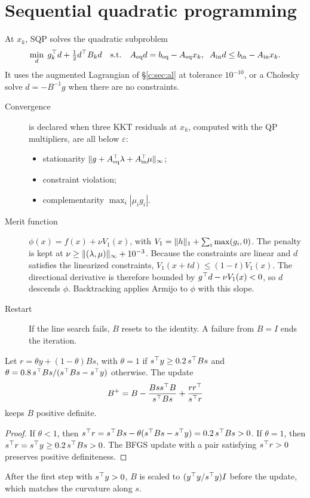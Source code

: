 \section{Sequential quadratic programming}
At $x_k$, SQP solves the quadratic subproblem
\[
  \min_d\;g_k^\top d+\tfrac12d^\top B_kd\quad\text{s.t.}\quad
  A_{\text{eq}}d=b_{\text{eq}}-A_{\text{eq}}x_k,\;\;A_{\text{in}}d\le b_{\text{in}}-A_{\text{in}}x_k .
\]
It uses the augmented Lagrangian of \S\ref{c:sec:al} at tolerance $10^{-10}$, or a Cholesky
solve $d=-B^{-1}g$ when there are no constraints.
\begin{description}
  \item[Convergence] is declared when three KKT residuals at $x_k$, computed with the QP
        multipliers, are all below $\varepsilon$:
        \begin{itemize}
          \item stationarity
                $\lVert g+A_{\text{eq}}^\top\lambda+A_{\text{in}}^\top\mu\rVert_\infty$;
          \item constraint violation;
          \item complementarity $\max_i|\mu_ig_i|$.
        \end{itemize}
  \item[Merit function] $\phi(x)=f(x)+\nu V_1(x)$, with
        $V_1=\lVert h\rVert_1+\sum_i\max(g_i,0)$. The penalty is kept at
        $\nu\ge\lVert (\lambda,\mu)\rVert_\infty+10^{-3}$. Because the constraints are linear and
        $d$ satisfies the linearized constraints, $V_1(x+td)\le(1-t)V_1(x)$. The
        directional derivative is therefore bounded by $g^\top d-\nu V_1(x)<0$, so $d$
        descends $\phi$. Backtracking applies Armijo to $\phi$ with this slope.
  \item[Restart] If the line search fails, $B$ resets to the identity. A failure from
        $B=I$ ends the iteration.
\end{description}

\begin{proposition}
Let $r=\theta y+(1-\theta)Bs$, with $\theta=1$ if $s^\top y\ge0.2\,s^\top Bs$ and
$\theta=0.8\,s^\top Bs/(s^\top Bs-s^\top y)$ otherwise. The update
\[
  B^+=B-\frac{Bss^\top B}{s^\top Bs}+\frac{rr^\top}{s^\top r}
\]
keeps $B$ positive definite.
\end{proposition}
\begin{proof}
If $\theta<1$, then $s^\top r=s^\top Bs-\theta(s^\top Bs-s^\top y)=0.2\,s^\top Bs>0$. If $\theta=1$,
then $s^\top r=s^\top y\ge0.2\,s^\top Bs>0$. The BFGS update with a pair satisfying $s^\top r>0$
preserves positive definiteness.
\end{proof}
After the first step with $s^\top y>0$, $B$ is scaled to $(y^\top y/s^\top y)I$ before the update,
which matches the curvature along $s$.
\begin{codepointers}
\end{codepointers}

